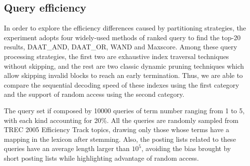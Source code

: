 \documentclass[runningheads]{comsis2}
\begin{document}
\subsection{Query efficiency}

In order to explore the efficiency differences caused by partitioning strategies, the experiment adopts four widely-used methods of ranked query to find the top-20 results, DAAT\_AND, DAAT\_OR, WAND and Maxscore.
Among these query processing strategies, the first two are exhaustive index traversal techniques without skipping, and the rest are two classic dynamic pruning techniques which allow skipping invalid blocks to reach an early termination.
Thus, we are able to compare the sequential decoding speed of these indexes using the first category and the support of random access using the second category.

The query set if composed by 10000 queries of term number ranging from 1 to 5, with each kind accounting for 20\%.
All the queries are randomly sampled from TREC 2005 Efficiency Track topics, drawing only those whose terms have a mapping in the lexicon after stemming.
Also, the posting lists related to these queries have an average length larger than $ 10^5 $, avoiding the bias brought by short posting lists while highlighting advantage of random access.
\end{document}
